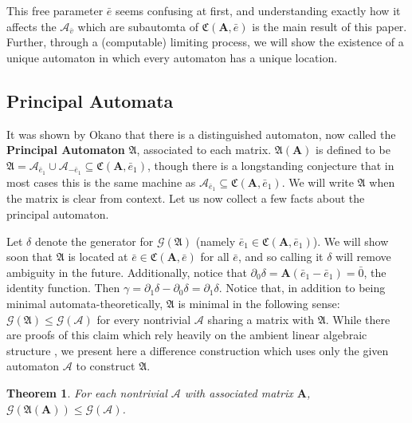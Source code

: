 \documentclass[12pt]{article}
\newcommand{\A}{\mathcal{A}}
\newcommand{\G}{\mathcal{G}}
\renewcommand{\P}{\mathfrak{A}}
\newcommand{\C}{\mathfrak{C}(\Am,\e)}
\newcommand{\2}{\textbf{2}}
\newcommand{\Am}{\textbf{A}}
\newcommand{\del}{\partial}
\renewcommand{\v}{\bar{v}}
\newcommand{\e}{\bar{e}}
\newtheorem{thm}{Theorem}
\begin{document}
This free parameter $\e$ seems confusing at first, and understanding exactly
how it affects the $\A_{\v}$ which are subautomta of $\C$ is the main result 
of this paper. Further, through a (computable) limiting process, we will show 
the existence of a unique automaton in which every automaton has a 
unique location.

\subsection{Principal Automata}
It was shown by Okano \cite{Okano15:thesis} that there is a 
distinguished automaton, now called the \textbf{Principal Automaton} $\P$, 
associated to each matrix. $\P(\Am)$ is defined to be 
$\P = \A_{\e_1} \cup \A_{-\e_1} \subseteq \mathfrak{C}(\Am, \e_1)$,
though there is a longstanding conjecture that in most cases this is
the same machine as $\A_{\e_1} \subseteq \mathfrak{C}(\Am, \e_1)$.
We will write $\P$ when the matrix is clear from context.
Let us now collect a few facts about the principal automaton.

Let $\delta$ denote the generator for $\G(\P)$ 
(namely $\e_1 \in \mathfrak{C}(\Am, \e_1)$). We will show soon
that $\P$ is located at $\e \in \C$ for all $\e$,
and so calling it $\delta$ will remove ambiguity in the future.
Additionally, notice that $\del_0 \delta = \Am(\e_1 - \e_1) = \bar{0}$, 
the identity function. 
Then $\gamma = \del_1 \delta - \del_0 \delta = \del_1 \delta$.
Notice that, in addition to being minimal automata-theoretically, 
$\P$ is minimal in the following sense: 
$\G(\P) \leq \G(\A)$ for every nontrivial $\A$ sharing a matrix with $\P$. 
While there are proofs of this claim which rely heavily on the
ambient linear algebraic structure \cite{Okano15:thesis}, 
we present here a difference construction which uses only the given 
automaton $\A$ to construct $\P$.

\begin{thm}
  For each nontrivial $\A$ with associated matrix $\Am$, 
  $\G(\P(\Am)) \leq \G(\A)$.
\end{thm}
\end{document}
